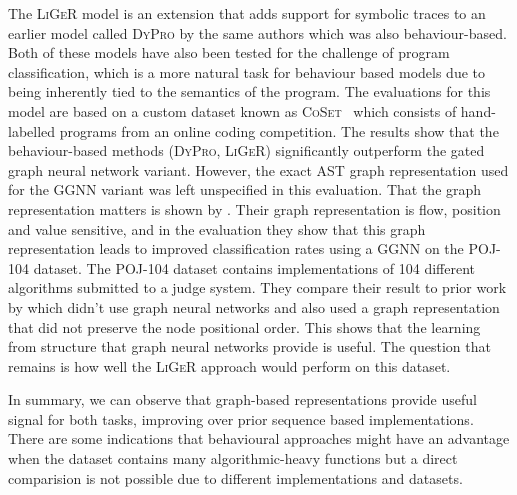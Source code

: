 \documentclass[sigconf,authordraft=true,nonacm=true]{acmart}
\begin{document}
The \textsc{LiGeR} model is an extension that adds support for symbolic traces to an earlier model called \textsc{DyPro} by the same authors which was also behaviour-based.
Both of these models have also been tested for the challenge of program classification, which is a more natural task for behaviour based models due to being inherently tied to the semantics of the program.
The evaluations for this model are based on a custom dataset known as \textsc{CoSet}~\cite{wang_coset_2019} which consists of hand-labelled programs from an online coding competition.
The results show that the behaviour-based methods (\textsc{DyPro}, \textsc{LiGeR}) significantly outperform the gated graph neural network variant.
However, the exact AST graph representation used for the GGNN variant was left unspecified in this evaluation.
That the graph representation matters is shown by \citet{cummins_programl_2020}.
Their graph representation is flow, position and value sensitive, and in the evaluation they show that this graph representation leads to improved classification rates using a GGNN on the POJ-104 dataset.
The POJ-104 dataset contains implementations of 104 different algorithms submitted to a judge system.
They compare their result to prior work by \citet{ben-nun_neural_2018} which didn't use graph neural networks and also used a graph representation that did not preserve the node positional order.
This shows that the learning from structure that graph neural networks provide is useful.
The question that remains is how well the \textsc{LiGeR} approach would perform on this dataset.

In summary, we can observe that graph-based representations provide useful signal for both tasks, improving over prior sequence based implementations.
There are some indications that behavioural approaches might have an advantage when the dataset contains many algorithmic-heavy functions but a direct comparision is not possible due to different implementations and datasets.
\end{document}
